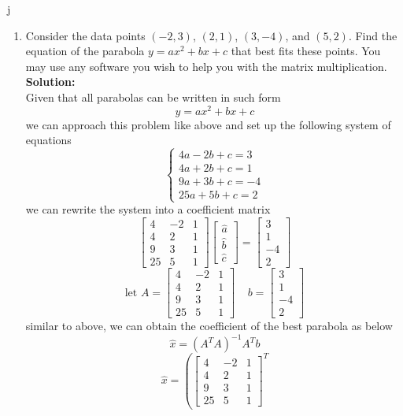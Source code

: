 j\documentclass[12pt]{article}
\begin{document}
\begin{enumerate}
 
		
\item Consider the data points $(-2, 3)$, $(2, 1)$, $(3, -4)$, and $(5, 2)$.
Find the equation of the parabola $y=ax^{2}+bx + c$ that best fits these points.  You may use any software you wish to help you with the matrix multiplication.  
\\
\textbf{Solution:}\\
Given that all parabolas can be written in such form
\[
y = ax^2+bx+c
\]
we can approach this problem like above and set up the following system of equations
\[
\begin{cases}
    4a-2b+c=3\\
    4a+2b+c=1\\
    9a+3b+c=-4\\
    25a+5b+c=2
\end{cases}
\]
we can rewrite the system into a coefficient matrix
\[
\begin{bmatrix}
    4&-2&1\\
    4&2&1\\
    9&3&1\\
    25&5&1
\end{bmatrix}
\begin{bmatrix}
    \hat{a}\\ \hat{b}\\ \hat{c}
\end{bmatrix}
=
\begin{bmatrix}
    3\\1\\-4\\2
\end{bmatrix}
\]
\[
\text{let }A = 
\begin{bmatrix}
    4&-2&1\\
    4&2&1\\
    9&3&1\\
    25&5&1
\end{bmatrix}
\;\;\;\;
b = 
\begin{bmatrix}
    3\\1\\-4\\2
\end{bmatrix}
\]
similar to above, we can obtain the coefficient of the best parabola as below
\[
\hat{x} = (A^TA)^{-1}A^Tb
\]
\[
\hat{x} = 
\left(
\begin{bmatrix}
    4&-2&1\\
    4&2&1\\
    9&3&1\\
    25&5&1
\end{bmatrix}^T
\]
\end{enumerate}
\end{document}
